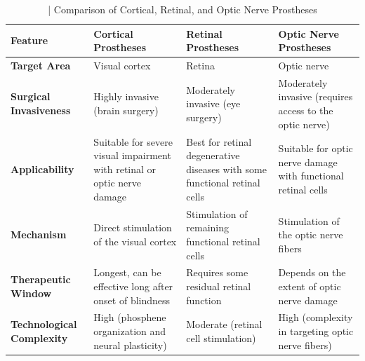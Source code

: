 \documentclass[twocolumn,10pt]{article}
\begin{document}
\begin{table}[ht!]
      \centering
      \fontsize{8pt}{10pt}\selectfont
      \caption{| Comparison of Cortical, Retinal, and Optic Nerve Prostheses}\label{tab:prostheses_comparison}
      \begin{tabularx}{\textwidth}{X X X X}
            \hline
            \textbf{Feature}                           & \textbf{Cortical Prostheses}                                                       & \textbf{Retinal Prostheses}                                                    & \textbf{Optic Nerve Prostheses}                                 \\ \hline
            \textbf{Target Area}                       & Visual cortex                                                                      & Retina                                                                         & Optic nerve                                                     \\ \hline
            \textbf{Surgical \newline Invasiveness}    & Highly invasive (brain surgery)                                                    & Moderately invasive (eye surgery)                                              & Moderately invasive (requires access to the optic nerve)        \\ \hline
            \textbf{Applicability}                     & Suitable for severe visual impairment with retinal or optic nerve damage           & Best for retinal degenerative diseases with some functional retinal cells      & Suitable for optic nerve damage with functional retinal cells   \\ \hline
            \textbf{Mechanism}                         & Direct stimulation of the visual cortex                                            & Stimulation of remaining functional retinal cells                              & Stimulation of the optic nerve fibers                           \\ \hline
            \textbf{Therapeutic \newline Window}       & Longest, can be effective long after onset of blindness                            & Requires some residual retinal function                                        & Depends on the extent of optic nerve damage                     \\ \hline
            \textbf{Technological \newline Complexity} & High (phosphene organization and neural plasticity)                                & Moderate (retinal cell stimulation)                                            & High (complexity in targeting optic nerve fibers)               \\ \hline

\end{tabularx}
\end{table}
\end{document}

